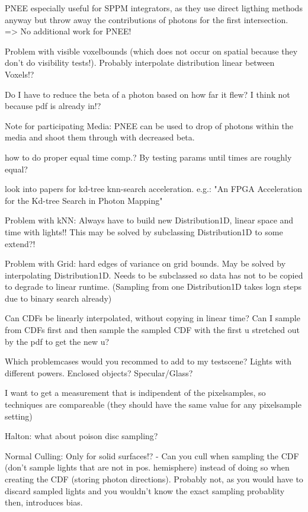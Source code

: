 PNEE especially useful for SPPM integrators, as they use direct ligthing methods anyway but throw away the contributions of photons for the first intersection. => No additional work for PNEE!

Problem with visible voxelbounds (which does not occur on spatial because they don't do visibility tests!). Probably interpolate distribution linear between Voxels!?

Do I have to reduce the beta of a photon based on how far it flew? I think not because pdf is already in!?

Note for participating Media: PNEE can be used to drop of photons within the media and shoot them through with decreased beta.

how to do proper equal time comp.? By testing params until times are roughly equal?

look into papers for kd-tree knn-search acceleration. e.g.: "An FPGA Acceleration for the Kd-tree Search in Photon Mapping"

Problem with kNN: Always have to build new Distribution1D, linear space and time with lights!! This may be solved by subclassing Distribution1D to some extend?!

Problem with Grid: hard edges of variance on grid bounds. May be solved by interpolating Distribution1D. Needs to be subclassed so data has not to be copied to degrade to linear runtime. (Sampling from one Distribution1D takes logn steps due to binary search already)

Can CDFs be linearly interpolated, without copying in linear time? Can I sample from CDFs first and then sample the sampled CDF with the first u stretched out by the pdf to get the new u?

Which problemcases would you recommed to add to my testscene? Lights with different powers. Enclosed objects? Specular/Glass?

I want to get a measurement that is indipendent of the pixelsamples, so techniques are compareable (they should have the same value for any pixelsample setting)

Halton: what about poison disc sampling?

Normal Culling: Only for solid surfaces!? - Can you cull when sampling the CDF (don't sample lights that are not in pos. hemisphere) instead of doing so when creating the CDF (storing photon directions). Probably not, as you would have to discard sampled lights and you wouldn't know the exact sampling probablity then, introduces bias.

